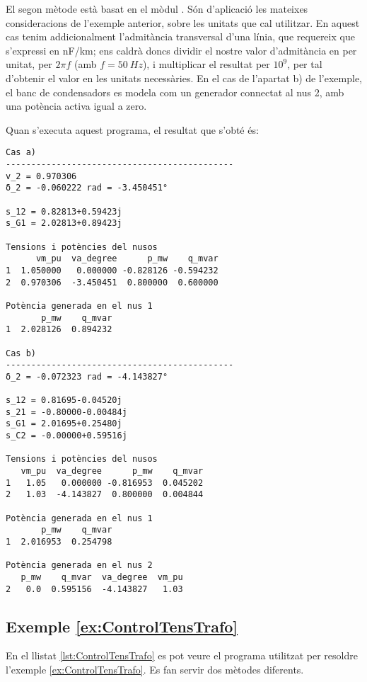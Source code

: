 El segon mètode està basat en el mòdul . Són d'aplicació les mateixes consideracions de l'exemple anterior, sobre les unitats que cal utilitzar. En aquest cas tenim addicionalment l'admitància transversal d'una línia, que  requereix que s'expressi en \unit{nF/km}; ens caldrà doncs dividir el nostre valor d'admitància en per unitat, per $2 \pi f$ (amb $f = \qty{50}{Hz}$), i multiplicar el resultat per $10^9$, per tal d'obtenir el valor en les unitats necessàries. En el cas de l'apartat  b) de l'exemple, el banc de condensadors es modela com un generador connectat al nus 2, amb una potència activa  igual a zero.




Quan s'executa aquest programa, el resultat que s'obté és:
\lstset{
	language=,
	numbers=none,
	frame=none
}
\begin{lstlisting}
Cas a)
---------------------------------------------
v_2 = 0.970306
δ_2 = -0.060222 rad = -3.450451°

s_12 = 0.82813+0.59423j
s_G1 = 2.02813+0.89423j

Tensions i potències del nusos
      vm_pu  va_degree      p_mw    q_mvar
1  1.050000   0.000000 -0.828126 -0.594232
2  0.970306  -3.450451  0.800000  0.600000

Potència generada en el nus 1
       p_mw    q_mvar
1  2.028126  0.894232

Cas b)
---------------------------------------------
δ_2 = -0.072323 rad = -4.143827°

s_12 = 0.81695-0.04520j
s_21 = -0.80000-0.00484j
s_G1 = 2.01695+0.25480j
s_C2 = -0.00000+0.59516j

Tensions i potències del nusos
   vm_pu  va_degree      p_mw    q_mvar
1   1.05   0.000000 -0.816953  0.045202
2   1.03  -4.143827  0.800000  0.004844

Potència generada en el nus 1
       p_mw    q_mvar
1  2.016953  0.254798

Potència generada en el nus 2
   p_mw    q_mvar  va_degree  vm_pu
2   0.0  0.595156  -4.143827   1.03
\end{lstlisting} 


\hypertarget{exemple:ControlTensTrafo}{\subsection{Exemple \ref*{ex:ControlTensTrafo} \ControlTensTrafo}}
En el llistat \vref{lst:ControlTensTrafo} es pot veure el programa utilitzat per resoldre l'exemple \vref{ex:ControlTensTrafo}. Es fan servir dos mètodes diferents.

